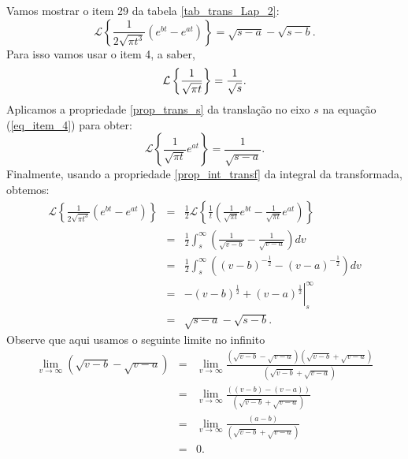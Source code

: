 \begin{ex}Vamos mostrar o item 29 da tabela \ref{tab_trans_Lap_2}:
\begin{equation}
\mathcal{L}\left\{\frac{1}{2\sqrt{\pi t^3}}\left(e^{bt}-e^{at}\right)\right\}=\sqrt{s-a}-\sqrt{s-b}.
\end{equation}
Para isso vamos usar o item 4, a saber,
\begin{equation}{\label{eq_item_4}}
\mathcal{L}\left\{\frac{1}{\sqrt{\pi t}}\right\}=\frac{1}{\sqrt{s}}.
\end{equation}
Aplicamos a propriedade \ref{prop_trans_s} da translação no eixo $s$ na equação (\ref{eq_item_4}) para obter:
\begin{equation*}
\mathcal{L}\left\{\frac{1}{\sqrt{\pi t}}e^{at}\right\}=\frac{1}{\sqrt{s-a}}.
\end{equation*}
Finalmente, usando a propriedade \ref{prop_int_transf} da integral da transformada, obtemos:
\begin{eqnarray*}
\mathcal{L}\left\{\frac{1}{2\sqrt{\pi t^3}}\left(e^{bt}-e^{at}\right)\right\}&=&\frac{1}{2}\mathcal{L}\left\{\frac{1}{t}\left(\frac{1}{\sqrt{\pi t}}e^{bt}-\frac{1}{\sqrt{\pi t}}e^{at}\right)\right\}\\
&=&\frac{1}{2}\int_s^\infty\left(   \frac{1}{\sqrt{v-b}}-  \frac{1}{\sqrt{v-a}}\right)dv\\
&=&\frac{1}{2}\int_s^\infty  \left( \left(v-b\right)^{-\frac{1}{2}}-  \left(v-a\right)^{-\frac{1}{2}}\right)dv\\
&=&\left. -\left(v-b\right)^{\frac{1}{2}}+ \left(v-a\right)^{\frac{1}{2}}\right|_s^\infty\\
&=&\sqrt{s-a}-\sqrt{s-b}.
\end{eqnarray*}
Observe que aqui usamos o seguinte limite no infinito
\begin{eqnarray*}
\lim_{v\to\infty}\left( \sqrt{v-b}- \sqrt{v-a}\right)&=&\lim_{v\to\infty}\frac{\left(\sqrt{v-b}- \sqrt{v-a}\right)\left(\sqrt{v-b}+ \sqrt{v-a}\right)}{\left(\sqrt{v-b}+ \sqrt{v-a}\right)}\\
&=&\lim_{v\to\infty}\frac{\left((v-b)- (v-a)\right)}{\left(\sqrt{v-b}+ \sqrt{v-a}\right)}\\
&=&\lim_{v\to\infty}\frac{\left(a-b\right)}{\left(\sqrt{v-b}+ \sqrt{v-a}\right)}\\
&=&0.
\end{eqnarray*}
\end{ex}
